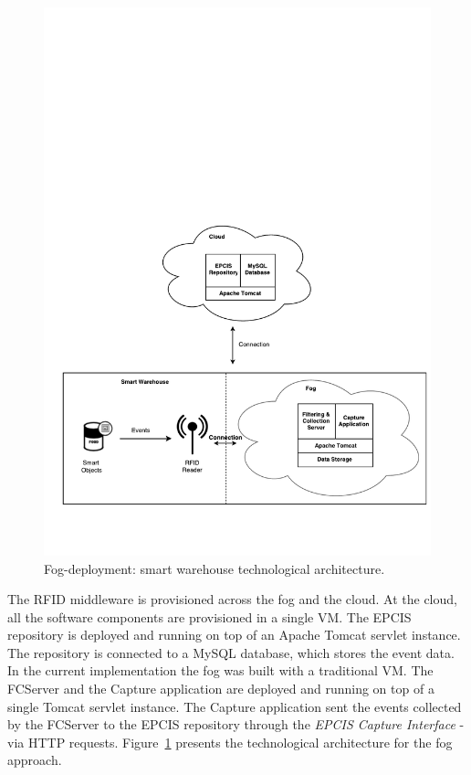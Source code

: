 \begin{figure}[ht!]
\centering
\includegraphics[width=\textwidth]{./images/implementation_fog_architecture}
\caption[Fog-deployment: technological architecture.]{Fog-deployment: smart warehouse technological architecture.}
\label{fig:implementation_fog_architecture}
\end{figure}

The \gls{RFID} middleware is provisioned across the fog and the cloud. At the cloud,
all the software components are provisioned in a single \gls{VM}. The \gls{EPCIS} repository is deployed
and running on top of an Apache Tomcat servlet instance. The repository is connected to a MySQL
database, which stores the event data. In the current implementation the fog was built with a traditional
\gls{VM}. The \gls{FCServer} and the Capture application are deployed and running on top of a single
Tomcat servlet instance. The Capture application sent the events collected by the \gls{FCServer} to
the \gls{EPCIS} repository through the \textit{\gls{EPCIS} Capture Interface} - via \gls{HTTP} requests.
Figure~\ref{fig:implementation_fog_architecture} presents the technological architecture for the fog
approach.\\

